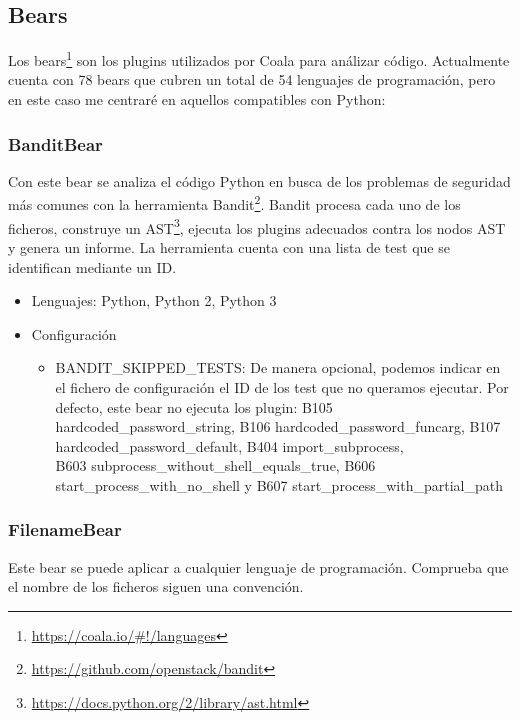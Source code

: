 \documentclass[a4paper, 12pt]{book}
\begin{document}
\subsection{Bears}
\label{sec:seccion1.2}
Los bears\footnote{\url{https://coala.io/#!/languages}} son los plugins utilizados por Coala para análizar código. Actualmente cuenta con 78 bears que cubren un total de 54 lenguajes de programación, pero en este caso me centraré en aquellos compatibles con Python:

\subsubsection{BanditBear}
\label{sec:seccion1.2.1}
Con este bear se analiza el código Python en busca de los problemas de seguridad más comunes con la herramienta Bandit\footnote{\url{https://github.com/openstack/bandit}}. Bandit procesa cada uno de los ficheros, construye un AST\footnote{\url{https://docs.python.org/2/library/ast.html}}, ejecuta los plugins adecuados contra los nodos AST y genera un informe. La herramienta cuenta con una lista de test que se identifican mediante un ID.

\begin{itemize}
  \item Lenguajes: Python, Python 2, Python 3
  \item Configuración
    \begin{itemize}
          \item BANDIT\_SKIPPED\_TESTS: De manera opcional, podemos indicar en el fichero de configuración el ID de los test que no queramos ejecutar. Por defecto, este bear no ejecuta los plugin: B105  hardcoded\_password\_string, B106  hardcoded\_password\_funcarg, B107  hardcoded\_password\_default, B404  import\_subprocess,\\ B603  subprocess\_without\_shell\_equals\_true, B606  start\_process\_with\_no\_shell y B607  start\_process\_with\_partial\_path
    \end{itemize}
\end{itemize}

\subsubsection{FilenameBear}
\label{sec:seccion1.2.2}
Este bear se puede aplicar a cualquier lenguaje de programación. Comprueba que el nombre de los ficheros siguen una convención.
\end{document}
